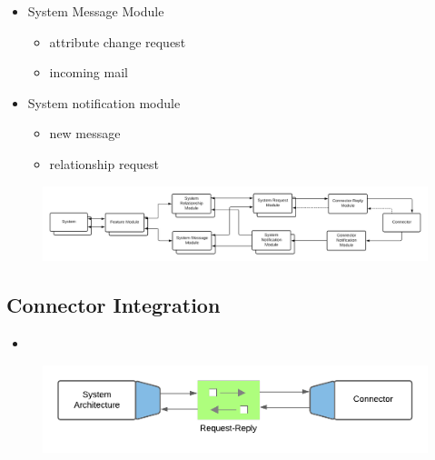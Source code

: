 \begin{itemize}
\begin{itemize}
\begin{itemize}
        \end{itemize}
        \item System Message Module
        \begin{itemize}
            \item attribute change request
            \item incoming mail
        \end{itemize}
        \item System notification module
        \begin{itemize}
            \item new message
            \item relationship request
        \end{itemize}
    \end{itemize}
\end{itemize}

\begin{figure}[h]
    \centering
    \includegraphics[scale=0.15]{Diagrams/Integration Architecture 1/Technological Integration/Connector/0. Modules Overview.png}
\end{figure}


\subsection{Connector Integration}

\begin{itemize}
    \item 
\end{itemize}

\begin{figure}[h]
    \centering
    \includegraphics[scale=0.15]{Diagrams/Integration Architecture 1/Technological Integration/Connector/1. Request-Reply.png}
\end{figure}


